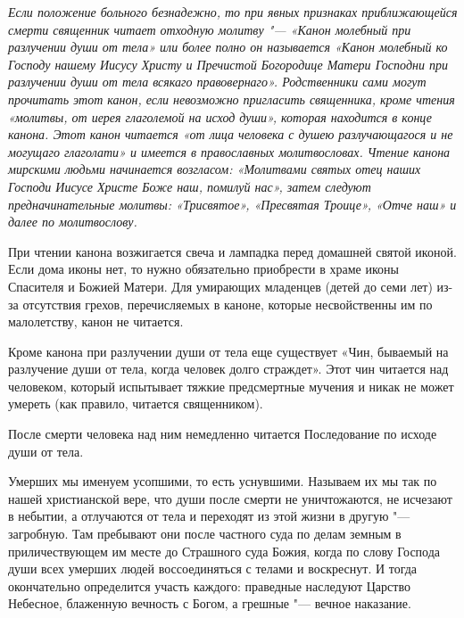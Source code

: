

\label{_content_molitvi-pered-smertyu}

 

 


\itshape Если положение больного безнадежно, то при явных признаках приближающейся смерти священник читает отходную молитву "--- «Канон молебный при разлучении души от тела» или более полно он называется «Канон молебный ко Господу нашему Иисусу Христу и Пречистой Богородице Матери Господни при разлучении души от тела всякаго правовернаго». Родственники сами могут прочитать этот канон, если невозможно пригласить священника, кроме чтения «молитвы, от иерея глаголемой на исход души», которая находится в конце канона. Этот канон читается «от лица человека с душею разлучающагося и не могущаго глаголати» и имеется в православных молитвословах. Чтение канона мирскими людьми начинается возгласом: «Молитвами святых отец наших Господи Иисусе Христе Боже наш, помилуй нас», затем следуют предначинательные молитвы: «Трисвятое», «Пресвятая Троице», «Отче наш» и далее по молитвослову. 

При чтении канона возжигается свеча и лампадка перед домашней святой иконой. Если дома иконы нет, то нужно обязательно приобрести в храме иконы Спасителя и Божией Матери. Для умирающих младенцев (детей до семи лет) из-за отсутствия грехов, перечисляемых в каноне, которые несвойственны им по малолетству, канон не читается. 

Кроме канона при разлучении души от тела еще существует «Чин, бываемый на разлучение души от тела, когда человек долго страждет». Этот чин читается над человеком, который испытывает тяжкие предсмертные мучения и никак не может умереть (как правило, читается священником). 

После смерти человека над ним немедленно читается Последование по исходе души от тела. 

\normalfont{} 
\mychapterending

 


Умерших мы именуем усопшими, то есть уснувшими. Называем их мы так по нашей христианской вере, что души после смерти не уничтожаются, не исчезают в небытии, а отлучаются от тела и переходят из этой жизни в другую "--- загробную. Там пребывают они после частного суда по делам земным в приличествующем им месте до Страшного суда Божия, когда по слову Господа души всех умерших людей воссоединяться с телами и воскреснут. И тогда окончательно определится участь каждого: праведные наследуют Царство Небесное, блаженную вечность с Богом, а грешные "--- вечное наказание. 

